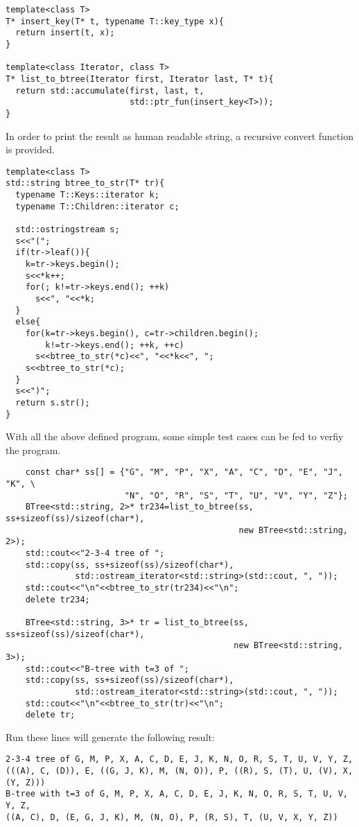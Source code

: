 \documentclass{article}
\begin{document}
\begin{lstlisting}
template<class T>
T* insert_key(T* t, typename T::key_type x){
  return insert(t, x);
}

template<class Iterator, class T>
T* list_to_btree(Iterator first, Iterator last, T* t){
  return std::accumulate(first, last, t,
                         std::ptr_fun(insert_key<T>));
}
\end{lstlisting}

In order to print the result as human readable string, a recursive
convert function is provided.

\begin{lstlisting}
template<class T>
std::string btree_to_str(T* tr){
  typename T::Keys::iterator k;
  typename T::Children::iterator c;

  std::ostringstream s;
  s<<"(";
  if(tr->leaf()){
    k=tr->keys.begin();
    s<<*k++;
    for(; k!=tr->keys.end(); ++k)
      s<<", "<<*k;
  }
  else{
    for(k=tr->keys.begin(), c=tr->children.begin();
        k!=tr->keys.end(); ++k, ++c)
      s<<btree_to_str(*c)<<", "<<*k<<", ";
    s<<btree_to_str(*c);
  }
  s<<")";
  return s.str();
}
\end{lstlisting}

With all the above defined program, some simple test cases can be
fed to verfiy the program.

\begin{lstlisting}
    const char* ss[] = {"G", "M", "P", "X", "A", "C", "D", "E", "J", "K", \
                        "N", "O", "R", "S", "T", "U", "V", "Y", "Z"};
    BTree<std::string, 2>* tr234=list_to_btree(ss, ss+sizeof(ss)/sizeof(char*),
                                               new BTree<std::string, 2>);
    std::cout<<"2-3-4 tree of ";
    std::copy(ss, ss+sizeof(ss)/sizeof(char*), 
              std::ostream_iterator<std::string>(std::cout, ", "));
    std::cout<<"\n"<<btree_to_str(tr234)<<"\n";
    delete tr234;

    BTree<std::string, 3>* tr = list_to_btree(ss, ss+sizeof(ss)/sizeof(char*),
                                              new BTree<std::string, 3>);
    std::cout<<"B-tree with t=3 of ";
    std::copy(ss, ss+sizeof(ss)/sizeof(char*), 
              std::ostream_iterator<std::string>(std::cout, ", "));
    std::cout<<"\n"<<btree_to_str(tr)<<"\n";
    delete tr;
\end{lstlisting}

Run these lines will generate the following result:

\begin{verbatim}
2-3-4 tree of G, M, P, X, A, C, D, E, J, K, N, O, R, S, T, U, V, Y, Z, 
(((A), C, (D)), E, ((G, J, K), M, (N, O)), P, ((R), S, (T), U, (V), X, (Y, Z)))
B-tree with t=3 of G, M, P, X, A, C, D, E, J, K, N, O, R, S, T, U, V, Y, Z, 
((A, C), D, (E, G, J, K), M, (N, O), P, (R, S), T, (U, V, X, Y, Z))
\end{verbatim}
\end{document}
